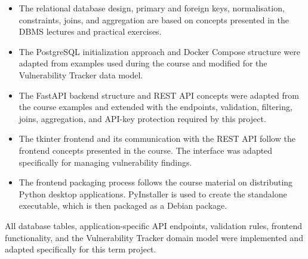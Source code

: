\documentclass[11pt,a4paper]{article}
\begin{document}
\begin{itemize}[leftmargin=1.4em]
  \item The relational database design, primary and foreign keys,
        normalisation, constraints, joins, and aggregation are based on
        concepts presented in the DBMS lectures and practical exercises.

  \item The PostgreSQL initialization approach and Docker Compose structure
        were adapted from examples used during the course and modified for the
        Vulnerability Tracker data model.

  \item The FastAPI backend structure and REST API concepts were adapted from
        the course examples and extended with the endpoints, validation,
        filtering, joins, aggregation, and API-key protection required by this
        project.

  \item The tkinter frontend and its communication with the REST API follow
        the frontend concepts presented in the course. The interface was
        adapted specifically for managing vulnerability findings.

  \item The frontend packaging process follows the course material on
        distributing Python desktop applications. PyInstaller is used to
        create the standalone executable, which is then packaged as a Debian
        package.
\end{itemize}

All database tables, application-specific API endpoints, validation rules,
frontend functionality, and the Vulnerability Tracker domain model were
implemented and adapted specifically for this term project.

\end{document}

